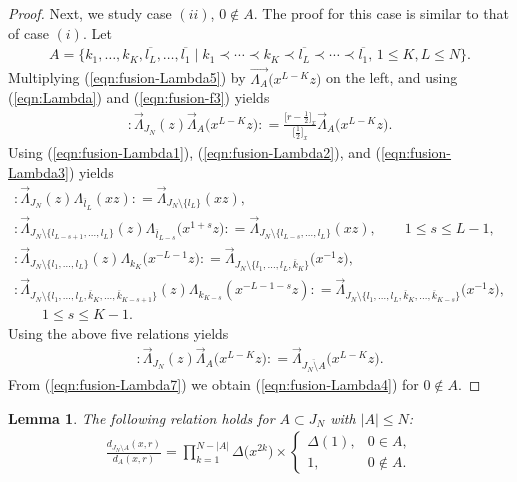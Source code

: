 \documentclass[pdftex]{sigma}
\numberwithin{equation}{section}
\newtheorem{Lemma}[Theorem]{Lemma}
\begin{document}
\begin{proof}
Next, we study case $(ii)$, $0 \notin A$. The proof for this case is similar to that of case $(i)$.
Let
\begin{gather*}
A=\big\{k_1, \dots,k_K, \overline{l_L}, \dots, \overline{l_1} \mid
k_1\prec \cdots \prec k_K \prec\overline{l_L} \prec \cdots \prec \overline{l_1},\,
1\leq K, L \leq N\big\}.
\end{gather*}
Multiplying (\ref{eqn:fusion-Lambda5}) by
$\overrightarrow{\Lambda_A}\big(x^{L-K}z\big)$
on the left, and using (\ref{eqn:Lambda}) and (\ref{eqn:fusion-f3}) yields
\begin{gather}
{:}\overrightarrow{\Lambda}_{J_N}(z)
\overrightarrow{\Lambda}_A\big(x^{L-K}z\big){:}=\frac{\big[r-\frac{1}{2}\big]_x}{\big[\frac{1}{2}\big]_x}
\overrightarrow{\Lambda}_A\big(x^{L-K}z\big).
\label{eqn:fusion-Lambda7}
\end{gather}
Using (\ref{eqn:fusion-Lambda1}), (\ref{eqn:fusion-Lambda2}), and
(\ref{eqn:fusion-Lambda3}) yields
\begin{gather*}
{:}\overrightarrow{\Lambda}_{J_N}(z)\Lambda_{\overline{l}_L}(xz){:}
=\overrightarrow{\Lambda}_{J_N{\setminus} \{l_L\}}(xz),
\\
{:}\overrightarrow{\Lambda}_{J_N{\setminus}
\{l_{L-s+1},\dots, l_{L}\}}(z)\Lambda_{\overline{l}_{L-s}}\big(x^{1+s}z\big){:}
=\overrightarrow{\Lambda}_{J_N{\setminus}
\{l_{L-s},\dots, l_L\}}(xz),\qquad
1\leq s \leq L-1,
\\
{:}\overrightarrow{\Lambda}_{J_N{\setminus} \{l_1, \dots, l_L\}}(z)
\Lambda_{{k}_K}\big(x^{-L-1}z\big){:}
=\overrightarrow{\Lambda}_{J_N{\setminus} \{l_1,\dots, l_L, \overline{k}_K\}}\big(x^{-1}z\big),
\\
{:}\overrightarrow{\Lambda}_{J_N{\setminus} \{l_1,\dots, l_{L},
\overline{k}_K, \dots, \overline{k}_{K-s+1}\}}(z)
\Lambda_{{k}_{K-s}}(x^{-L-1-s}z){:}
=\overrightarrow{\Lambda}_{J_N{\setminus} \{l_1,\dots, l_L, \overline{k}_K,\dots, \overline{k}_{K-s}\}}\big(x^{-1}z\big),
\\
\qquad
1\leq s \leq K-1.
\end{gather*}
Using the above five relations yields
\begin{gather*}
{:}\overrightarrow{\Lambda}_{J_N}(z)\overrightarrow{\Lambda}_A\big(x^{L-K}z\big){:}=
\overrightarrow{\Lambda}_{\overline{J_N \setminus A}}\big(x^{L-K}z\big).
\end{gather*}
From (\ref{eqn:fusion-Lambda7}) we obtain (\ref{eqn:fusion-Lambda4}) for $0 \notin A$.
\end{proof}

\begin{Lemma}
The following relation holds for $A \subset J_N$ with $|A|\leq N$:
\begin{gather}
\frac{d_{{J_N \setminus A}}(x,r)}{d_{A}(x,r)}=\prod_{k=1}^{N-|A|}
\Delta\big(x^{2k}\big){\times}
\begin{cases}
\Delta(1),& 0 \in A,
\\
1,&0 \notin A.
\end{cases}
\label{eqn:d}
\end{gather}
\end{Lemma}
\end{document}
